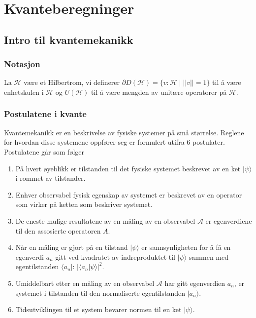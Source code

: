 \section{Kvanteberegninger}

\subsection{Intro til kvantemekanikk}

    \subsubsection*{Notasjon}

        La $\mathcal{H}$ være et Hilbertrom, vi definerer $\partial D(\mathcal{H})=\{v:\mathcal{H}\mid ||v||=1\}$ til å være enhetskulen i $\mathcal{H}$ og $U(\mathcal{H})$ til å være mengden av unitære operatorer på $\mathcal{H}$.

    \subsubsection*{Postulatene i kvante}

        Kvantemekanikk er en beskrivelse av fysiske systemer på små størrelse. Reglene for hvordan disse systemene oppfører seg er formulert utifra 6 postulater. Postulatene går som følger
        \begin{enumerate}
            \item På hvert øyeblikk er tilstanden til det fysiske systemet beskrevet av en ket $|\psi\rangle$ i rommet av tilstander.
            \item Enhver observabel fysisk egenskap av systemet er beskrevet av en operator som virker på ketten som beskriver systemet.
            \item De eneste mulige resultatene av en måling av en observabel $\mathcal{A}$ er egenverdiene til den assosierte operatoren $A$.
            \item Når en måling er gjort på en tilstand $|\psi\rangle$ er sannsynligheten for å få en egenverdi $a_n$ gitt ved kvadratet av indreproduktet til $|\psi\rangle$ sammen med egentilstanden $\langle a_n|$: $|\langle a_n|\psi\rangle|^2$.
            \item Umiddelbart etter en måling av en observabel $\mathcal{A}$ har gitt egenverdien $a_n$, er systemet i tilstanden til den normaliserte egentilstanden $|a_n\rangle$.
            \item Tidsutviklingen til et system bevarer normen til en ket $|\psi\rangle$.
        \end{enumerate}

